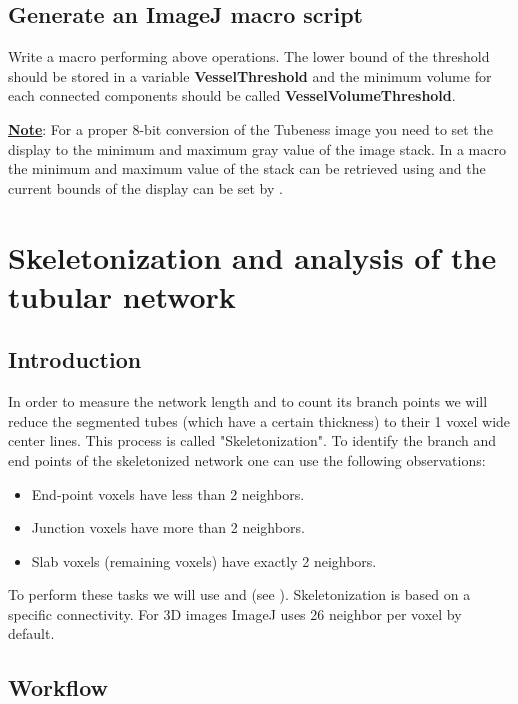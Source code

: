 \subsection{Generate an ImageJ macro script}
Write a macro performing above operations. The lower bound of the threshold should be stored in a variable \textbf{VesselThreshold} and the minimum volume for each connected components should be called \textbf{VesselVolumeThreshold}.

\textbf{\underline{Note}}: For a proper 8-bit conversion of the Tubeness image you need to set the display to the minimum and maximum gray value of the image stack. In a macro the minimum and maximum value of the stack can be retrieved using  and the current bounds of the display can be set by .
%




\section{Skeletonization and analysis of the tubular network}
%
\subsection{Introduction}
In order to measure the network length and to count its branch points we will reduce the segmented tubes (which have a certain thickness) to their 1 voxel wide center lines. This process is called "Skeletonization". 
To identify the branch and end points of the skeletonized network one can use the following observations:
\begin{itemize}
\item End-point voxels have less than 2 neighbors.
\item Junction voxels have more than 2 neighbors.
\item Slab voxels (remaining voxels) have exactly 2 neighbors.
\end{itemize}
To perform these tasks we will use  and  (see \cite{Arganda-Carreras2010}). Skeletonization is based on a specific connectivity. For 3D images ImageJ uses 26 neighbor per voxel by default.
%
\subsection{Workflow}

